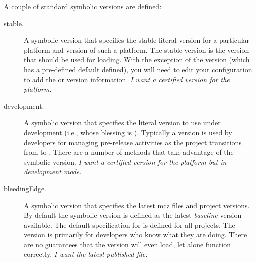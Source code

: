 \documentclass[a4paper,10pt,twoside]{book}
\begin{document}
A couple of standard symbolic versions are defined:

\begin{description}
\item[stable.] A symbolic version that specifies the stable literal version for a particular platform and version of such a platform. The stable version is the version that should be used for loading. With the exception of the  version (which has a pre-defined default defined), you will need to edit your configuration to add the  or  version information. \emph{I want a certified version for the platform.}

\item[development.] A symbolic version that specifies the literal version to use under development (i.e., whose blessing is ). Typically a  version is used by developers for managing pre-release activities as the project transitions from  to . There are a number of  methods that take advantage of the  symbolic version. \emph{I want a certified version for the platform but in development mode.}



\item[bleedingEdge.]  A symbolic version that specifies the latest mcz files and project versions. By default the  symbolic version is defined as the latest \emph{baseline} version available. The default specification for  is defined for all projects. The  version is primarily for developers who know what they are doing. There are no guarantees that the  version will even load, let alone function correctly. \emph{I want the latest published file.}

\end{description}

\end{document}
